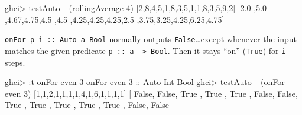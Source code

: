 \documentclass[]{article}
\newenvironment{Shaded}{}{}
\newcommand{\DataTypeTok}[1]{\textcolor[rgb]{0.56,0.13,0.00}{#1}}
\newcommand{\DecValTok}[1]{\textcolor[rgb]{0.25,0.63,0.44}{#1}}
\newcommand{\FloatTok}[1]{\textcolor[rgb]{0.25,0.63,0.44}{#1}}
\newcommand{\FunctionTok}[1]{\textcolor[rgb]{0.02,0.16,0.49}{#1}}
\newcommand{\NormalTok}[1]{#1}
\newcommand{\OperatorTok}[1]{\textcolor[rgb]{0.40,0.40,0.40}{#1}}
\newcommand{\OtherTok}[1]{\textcolor[rgb]{0.00,0.44,0.13}{#1}}
\renewcommand{\href}[2]{#2\footnote{\url{#1}}}
\begin{document}
\begin{Shaded}
\begin{Highlighting}[]
\NormalTok{ghci}\OperatorTok{\textgreater{}}\NormalTok{ testAuto\_ (rollingAverage }\DecValTok{4}\NormalTok{) [}\DecValTok{2}\NormalTok{,}\DecValTok{8}\NormalTok{,}\DecValTok{4}\NormalTok{,}\DecValTok{5}\NormalTok{,}\DecValTok{1}\NormalTok{,}\DecValTok{8}\NormalTok{,}\DecValTok{3}\NormalTok{,}\DecValTok{5}\NormalTok{,}\DecValTok{1}\NormalTok{,}\DecValTok{1}\NormalTok{,}\DecValTok{8}\NormalTok{,}\DecValTok{3}\NormalTok{,}\DecValTok{5}\NormalTok{,}\DecValTok{9}\NormalTok{,}\DecValTok{2}\NormalTok{]}
\NormalTok{[}\FloatTok{2.0}\NormalTok{ ,}\FloatTok{5.0}\NormalTok{ ,}\FloatTok{4.67}\NormalTok{,}\FloatTok{4.75}\NormalTok{,}\FloatTok{4.5}
\NormalTok{,}\FloatTok{4.5}\NormalTok{ ,}\FloatTok{4.25}\NormalTok{,}\FloatTok{4.25}\NormalTok{,}\FloatTok{4.25}\NormalTok{,}\FloatTok{2.5}
\NormalTok{,}\FloatTok{3.75}\NormalTok{,}\FloatTok{3.25}\NormalTok{,}\FloatTok{4.25}\NormalTok{,}\FloatTok{6.25}\NormalTok{,}\FloatTok{4.75}\NormalTok{]}
\end{Highlighting}
\end{Shaded}

\begin{description}
\tightlist
\item[\href{https://github.com/mstksg/inCode/tree/master/code-samples/machines/Auto.hs\#L125-L146}{onFor}]
\texttt{onFor\ p\ i\ ::\ Auto\ a\ Bool} normally outputs
\texttt{False}\ldots except whenever the input matches the given predicate
\texttt{p\ ::\ a\ -\textgreater{}\ Bool}. Then it stays ``on'' (\texttt{True})
for \texttt{i} steps.
\end{description}

\begin{Shaded}
\begin{Highlighting}[]
\NormalTok{ghci}\OperatorTok{\textgreater{}} \OperatorTok{:}\NormalTok{t onFor }\FunctionTok{even} \DecValTok{3}
\NormalTok{onFor }\FunctionTok{even} \DecValTok{3}\OtherTok{ ::} \DataTypeTok{Auto} \DataTypeTok{Int} \DataTypeTok{Bool}
\NormalTok{ghci}\OperatorTok{\textgreater{}}\NormalTok{ testAuto\_ (onFor }\FunctionTok{even} \DecValTok{3}\NormalTok{) [}\DecValTok{1}\NormalTok{,}\DecValTok{1}\NormalTok{,}\DecValTok{2}\NormalTok{,}\DecValTok{1}\NormalTok{,}\DecValTok{1}\NormalTok{,}\DecValTok{1}\NormalTok{,}\DecValTok{1}\NormalTok{,}\DecValTok{4}\NormalTok{,}\DecValTok{1}\NormalTok{,}\DecValTok{6}\NormalTok{,}\DecValTok{1}\NormalTok{,}\DecValTok{1}\NormalTok{,}\DecValTok{1}\NormalTok{,}\DecValTok{1}\NormalTok{]}
\NormalTok{[ }\DataTypeTok{False}\NormalTok{, }\DataTypeTok{False}\NormalTok{, }\DataTypeTok{True}\NormalTok{ , }\DataTypeTok{True}\NormalTok{ , }\DataTypeTok{True}
\NormalTok{, }\DataTypeTok{False}\NormalTok{, }\DataTypeTok{False}\NormalTok{, }\DataTypeTok{True}\NormalTok{ , }\DataTypeTok{True}\NormalTok{ , }\DataTypeTok{True}
\NormalTok{, }\DataTypeTok{True}\NormalTok{ , }\DataTypeTok{True}\NormalTok{ , }\DataTypeTok{False}\NormalTok{, }\DataTypeTok{False}\NormalTok{ ]}
\end{Highlighting}
\end{Shaded}
\end{document}
